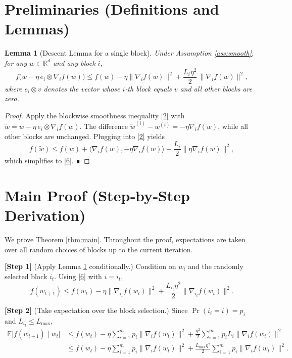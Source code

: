 \documentclass{article}
\newtheorem{lemma}{Lemma}
\newcommand{\E}{\mathbb{E}}
\newcommand{\R}{\mathbb{R}}
\begin{document}
\newpage

\section*{Preliminaries (Definitions and Lemmas)}
\begin{lemma}[Descent Lemma for a single block]\label{lem:descent}
Under Assumption \ref{ass:smooth}, for any $w\in\R^{d}$ and any block $i$,
\[
f\!\big(w - \eta\,e_i\otimes \nabla_i f(w)\big)
\le f(w) - \eta\|\nabla_i f(w)\|^{2}
+ \frac{L_i\eta^{2}}{2}\,\|\nabla_i f(w)\|^{2},
\tag{6}
\]
where $e_i\otimes v$ denotes the vector whose $i$‑th block equals $v$
and all other blocks are zero.
\end{lemma}
\begin{proof}
Apply the blockwise smoothness inequality \eqref{2} with
$\tilde w = w - \eta\,e_i\otimes \nabla_i f(w)$.  The difference
$\tilde w^{(i)}-w^{(i)} = -\eta \nabla_i f(w)$, while all other blocks are unchanged.
Plugging into \eqref{2} yields
\[
f(\tilde w)\le f(w)+\langle\nabla_i f(w),-\eta \nabla_i f(w)\rangle
+\frac{L_i}{2}\|\eta \nabla_i f(w)\|^{2},
\]
which simplifies to \eqref{6}.  ∎
\end{proof}

\section*{Main Proof (Step‑by‑Step Derivation)}
We prove Theorem \ref{thm:main}.  Throughout the proof, expectations are taken over all random
choices of blocks up to the current iteration.

\bigskip
\noindent\textbf{[Step 1]} (Apply Lemma \ref{lem:descent} conditionally.)  
Condition on $w_t$ and the randomly selected block $i_t$.  Using \eqref{6} with $i=i_t$,
\[
f(w_{t+1})
\le f(w_t)-\eta\|\nabla_{i_t} f(w_t)\|^{2}
+\frac{L_{i_t}\eta^{2}}{2}\|\nabla_{i_t} f(w_t)\|^{2}.
\tag{7}
\]

\noindent\textbf{[Step 2]} (Take expectation over the block selection.)  
Since $\Pr(i_t=i)=p_i$ and $L_{i_t}\le L_{\max}$,
\[
\begin{aligned}
\E\!\big[f(w_{t+1})\mid w_t\big]
&\le f(w_t)-\eta\sum_{i=1}^{m}p_i\|\nabla_i f(w_t)\|^{2}
+\frac{\eta^{2}}{2}\sum_{i=1}^{m}p_i L_i\|\nabla_i f(w_t)\|^{2}\\[4pt]
&\le f(w_t)-\eta\sum_{i=1}^{m}p_i\|\nabla_i f(w_t)\|^{2}
+\frac{L_{\max}\eta^{2}}{2}\sum_{i=1}^{m}p_i\|\nabla_i f(w_t)\|^{2}.
\end{aligned}
\tag{8}
\]
\end{document}
